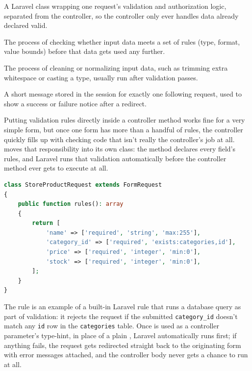 \begin{istilahpenting}
\begin{description}[leftmargin=0pt,style=nextline]
  \item[FormRequest] A Laravel class wrapping one request's validation and authorization logic, separated from the controller, so the controller only ever handles data already declared valid.
  \item[Validation] The process of checking whether input data meets a set of rules (type, format, value bounds) before that data gets used any further.
  \item[Sanitization] The process of cleaning or normalizing input data, such as trimming extra whitespace or casting a type, usually run after validation passes.
  \item[Flash Message] A short message stored in the session for exactly one following request, used to show a success or failure notice after a redirect.
\end{description}
\end{istilahpenting}

Putting validation rules directly inside a controller method works fine
for a very simple form, but once one form has more than a handful of
rules, the controller quickly fills up with checking code that isn't
really the controller's job at all.  moves that
responsibility into its own class: the  method
declares every field's rules, and Laravel runs that validation
automatically before the controller method ever gets to execute at all.

\begin{lstlisting}[language=php, title=\lstfile{app/Http/Requests/StoreProductRequest.php}]
class StoreProductRequest extends FormRequest
{
    public function rules(): array
    {
        return [
            'name' => ['required', 'string', 'max:255'],
            'category_id' => ['required', 'exists:categories,id'],
            'price' => ['required', 'integer', 'min:0'],
            'stock' => ['required', 'integer', 'min:0'],
        ];
    }
}
\end{lstlisting}

The  rule is an example of a built-in
Laravel rule that runs a database query as part of validation: it
rejects the request if the submitted \texttt{category\_id} doesn't
match any \texttt{id} row in the \texttt{categories} table. Once
 is used as a controller parameter's
type-hint, in place of a plain , Laravel automatically
runs  first; if anything fails, the request gets
redirected straight back to the originating form with error messages
attached, and the controller body never gets a chance to run at all.

